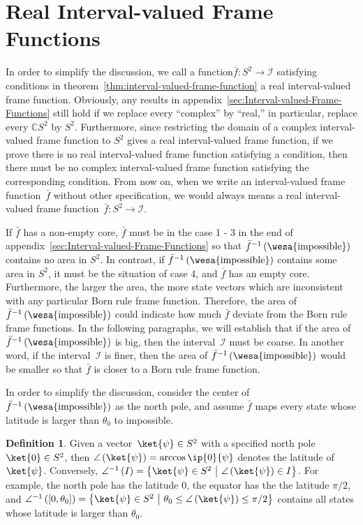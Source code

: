 \documentclass[12pt]{iopart}
\theoremstyle{plain}
\theoremstyle{definition}
\newtheorem{definition}[thm]{Definition}
\theoremstyle{remark}
\newcommand{\imposs}{{\mbox{\wesa{impossible}}}}
\newcommand{\set}[2]{\ensuremath{\left\{ {#1}~\middle|~{#2}\right\} }}
\newcommand{\nb}{\nolinebreak[3] }
\begin{document}
\section{Real Interval-valued Frame Functions\label{sec:Real-Interval-valued-Frame}}

In order to simplify the discussion, we call a function\nb$\bar{f}:S^{2}\rightarrow\mathscr{I}$
satisfying conditions in theorem~\ref{thm:interval-valued-frame-function}
a real interval-valued frame function. Obviously, any results in appendix~\ref{sec:Interval-valued-Frame-Functions}
still hold if we replace every ``complex'' by ``real,'' in particular,
replace every $\mathbb{C}S^{2}$ by $S^{2}$. Furthermore, since restricting
the domain of a complex interval-valued frame function to $S^{2}$
gives a real interval-valued frame function, if we prove there is
no real interval-valued frame function satisfying a condition, then
there must be no complex interval-valued frame function satisfying
the corresponding condition. From now on, when we write an interval-valued
frame function~$\bar{f}$ without other specification, we would always
means a real interval-valued frame function~$\bar{f}:S^{2}\rightarrow\mathscr{I}$.

If $\bar{f}$ has a non-empty core, $\bar{f}$ must be in the case
1 - 3 in the end of appendix~\ref{sec:Interval-valued-Frame-Functions}
so that $\bar{f}^{-1}\left(\imposs\right)$ contains no area in $S^{2}$.
In contrast, if $\bar{f}^{-1}\left(\imposs\right)$ contains some
area in $S^{2}$, it must be the situation of case 4, and $\bar{f}$
has an empty core. Furthermore, the larger the area, the more state
vectors which are inconsistent with any particular Born rule frame
function. Therefore, the area of $\bar{f}^{-1}\left(\imposs\right)$
could indicate how much $\bar{f}$ deviate from the Born rule frame
functions. In the following paragraphs, we will establish that if
the area of $\bar{f}^{-1}\left(\imposs\right)$ is big, then the interval~$\mathscr{I}$
must be coarse. In another word, if the interval~$\mathscr{I}$ is
finer, then the area of $\bar{f}^{-1}\left(\imposs\right)$ would
be smaller so that $\bar{f}$ is closer to a Born rule frame function.

In order to simplify the discussion, consider the center of $\bar{f}^{-1}\left(\imposs\right)$
as the north pole, and assume $\bar{f}$ maps every state whose latitude
is larger than $\theta_{0}$ to impossible.

\begin{definition}Given a vector~$\ket{\psi}\in S^{2}$ with a specified
north pole~$\ket{0}\in S^{2}$, then $\angle\left(\ket{\psi}\right)=\arccos\ip{0}{\psi}$
denotes the latitude of $\ket{\psi}$. Conversely, $\angle^{-1}\left(I\right)=\set{\ket{\psi}\in S^{2}}{\angle\left(\ket{\psi}\right)\in I}$.
For example, the north pole has the latitude $0$, the equator has
the the latitude $\pi / 2$, and $\angle^{-1}\left(\left[0,\theta_{0}\right]\right)=\set{\ket{\psi}\in S^{2}}{\theta_{0}\le\angle\left(\ket{\psi}\right)\le\pi / 2}$
contains all states whose latitude is larger than $\theta_{0}$.\end{definition}
\end{document}
